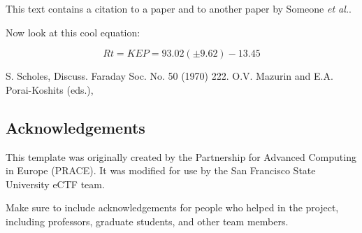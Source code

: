 \documentclass{prace}
\begin{document}
This text contains a citation to a paper\cite{scholes-DiscussFaradaySoc-70} and to another paper by Someone \emph{et al.}\cite{someone-SomeJournal-00}.

%

Now look at this cool equation:

\begin{equation}
	Rt = K EP = 93.02 (\pm 9.62) - 13.45
	\label{eq: example}
\end{equation}

%
\begin{thebibliography}{99}
	S. Scholes, Discuss. Faraday Soc. No. 50 (1970) 222.
	O.V. Mazurin and E.A. Porai-Koshits (eds.),
\end{thebibliography}

\subsection*{Acknowledgements}
This template was originally created by the Partnership for Advanced Computing
in Europe (PRACE). It was modified for use by the San Francisco State University
eCTF team.

Make sure to include acknowledgements for people who helped in the project,
including professors, graduate students, and other team members.

\end{document}
